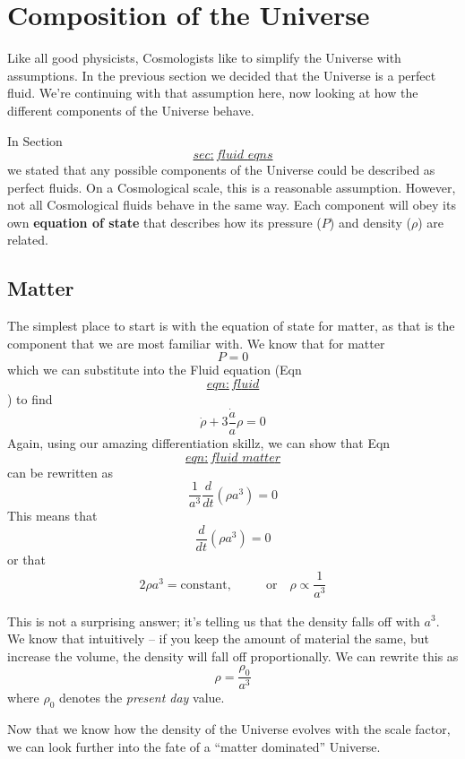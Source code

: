 \documentclass[]{book}
\begin{document}
\chapter{Composition of the Universe}\label{ch:constituents}

Like all good physicists, Cosmologists like to simplify the Universe
with assumptions. In the previous section we decided that the Universe
is a perfect fluid. We're continuing with that assumption here, now
looking at how the different components of the Universe behave.

In Section~\protect\hyperlink{sec:fluid_eqns}{\[sec:fluid\_eqns\]} we
stated that any possible components of the Universe could be described
as perfect fluids. On a Cosmological scale, this is a reasonable
assumption. However, not all Cosmological fluids behave in the same way.
Each component will obey its own \textbf{equation of state} that
describes how its pressure (\(P\)) and density (\(\rho\)) are related.

\hypertarget{sec:matter_eos}{\section{Matter}\label{sec:matter_eos}}

The simplest place to start is with the equation of state for matter, as
that is the component that we are most familiar with. We know that for
matter \[P = 0\] which we can substitute into the Fluid equation
(Eqn~\protect\hyperlink{eqn:fluid}{\[eqn:fluid\]}) to find
\[\label{eqn:fluid_matter}
    \dot{\rho} + 3\dfrac{\dot{a}}{a}\rho = 0\] Again, using our amazing
differentiation skillz, we can show that
Eqn~\protect\hyperlink{eqn:fluid_matter}{\[eqn:fluid\_matter\]} can be
rewritten as \[\dfrac{1}{a^3}\dfrac{d}{dt}\left(\rho a^3\right) = 0\]
This means that \[\dfrac{d}{dt}\left(\rho a^3\right) = 0\] or that
\[\begin{aligned}
{2}
    \rho a^3 = \text{constant,} &\qquad\text{or}\quad \rho \propto \dfrac{1}{a^3}\end{aligned}\]

This is not a surprising answer; it's telling us that the density falls
off with \(a^3\). We know that intuitively -- if you keep the amount of
material the same, but increase the volume, the density will fall off
proportionally. We can rewrite this as \[\rho = \dfrac{\rho_0}{a^3}\]
where \(\rho_0\) denotes the \emph{present day} value.

Now that we know how the density of the Universe evolves with the scale
factor, we can look further into the fate of a ``matter dominated''
Universe.
\end{document}
